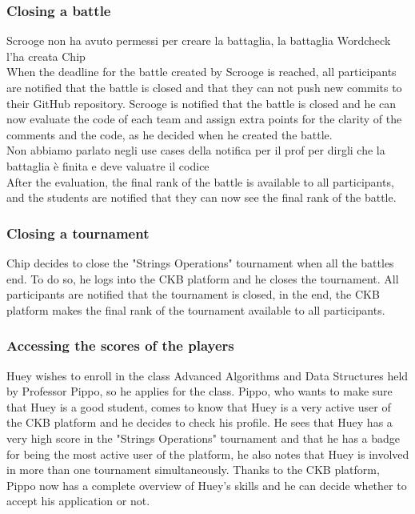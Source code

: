 \subsubsection{Closing a battle}
{\color{red} Scrooge non ha avuto permessi per creare la battaglia, la battaglia Wordcheck l'ha creata Chip} \\
When the deadline for the battle created by Scrooge is reached, all participants are notified that the battle is closed and that they can not push new commits to their GitHub repository.
Scrooge is notified that the battle is closed and he can now evaluate the code of each team and assign extra points for the clarity of the comments and the code, as he decided when he created the battle.
\\ {\color{red} Non abbiamo parlato negli use cases della notifica per il prof per dirgli che la battaglia è finita e deve valuatre il codice} \\
After the evaluation, the final rank of the battle is available to all participants, and the students are notified that they can now see the final rank of the battle.

\subsubsection{Closing a tournament}
Chip decides to close the "Strings Operations" tournament when all the battles end.
To do so, he logs into the CKB platform and he closes the tournament.
All participants are notified that the tournament is closed, in the end, the CKB platform makes the final rank of the tournament available to all participants.

\subsubsection{Accessing the scores of the players}
Huey wishes to enroll in the class Advanced Algorithms and Data Structures held by Professor Pippo, so he applies for the class.
Pippo, who wants to make sure that Huey is a good student, comes to know that Huey is a very active user of the CKB platform and he decides to check his profile.
He sees that Huey has a very high score in the "Strings Operations" tournament and that he has a badge for being the most active user of the platform, he also notes that Huey is involved in more than one tournament simultaneously.
Thanks to the CKB platform, Pippo now has a complete overview of Huey's skills and he can decide whether to accept his application or not.

